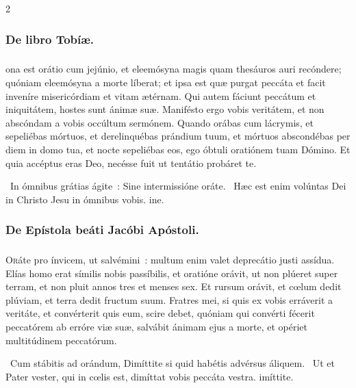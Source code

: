 \documentclass[9pt,twoside]{extarticle}
\begin{document}
\begin{multicols}{2}
\subsubsection*{\center De libro Tobíæ.}
\subsubsection*{\center {}}
ona est orátio cum jejúnio, et eleemósyna magis quam thesáuros auri recóndere; quóniam eleemósyna a morte líberat; et ipsa est quæ purgat peccáta et facit inveníre misericórdiam et vitam ætérnam. Qui autem fáciunt peccátum et iniquitátem, hostes sunt ánimæ suæ. Manifésto ergo vobis veritátem, et non abscóndam a vobis occúltum sermónem. Quando orábas cum lácrymis, et sepeliébas mórtuos, et derelinquébas prándium tuum, et mórtuos abscondébas per diem in domo tua, et nocte sepeliébas eos, ego óbtuli oratiónem tuam Dómino. Et quia accéptus eras Deo, necésse fuit ut tentátio probáret te.

\begin{tightlist}{}
\item {}~In ómnibus grátias ágite~: \textred{*} Sine intermissióne oráte. ~Hæc est enim volúntas Dei in Christo Jesu in ómnibus vobis. ine.
\end{tightlist}

\subsubsection*{\center De Epístola beáti Jacóbi Apóstoli.}
\subsubsection*{\center {}}
\lettrine{O}ráte pro ínvicem, ut salvémini~: multum enim valet deprecátio justi assídua. Elías homo erat símilis nobis passíbilis, et oratióne orávit, ut non plúeret super terram, et non pluit annos tres et menses sex. Et rursum orávit, et cœlum dedit plúviam, et terra dedit fructum suum. Fratres mei, si quis ex vobis erráverit a veritáte, et convérterit quis eum, scire debet, quóniam qui convérti fécerit peccatórem ab erróre viæ suæ, salvábit ánimam ejus a morte, et opériet multitúdinem peccatórum.

\begin{tightlist}{}
\item {}~Cum stábitis ad orándum, \textred{*} Dimíttite si quid habétis advérsus áliquem. ~Ut et Pater vester, qui in cœlis est, dimíttat vobis peccáta vestra. imíttite.
\end{tightlist}

\end{multicols}
\end{document}
